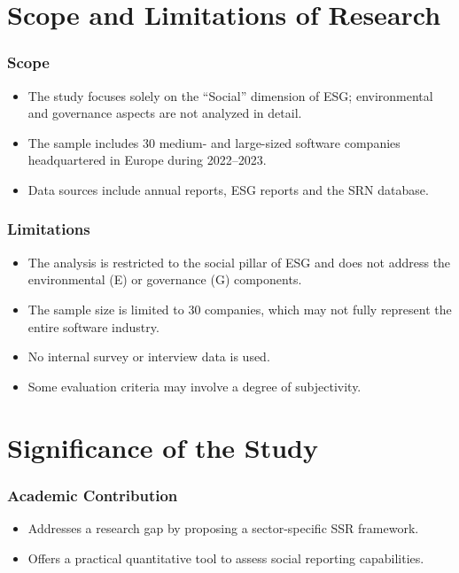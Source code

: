 \section{Scope and Limitations of Research}
\subsubsection{Scope}
\begin{itemize}
    \item The study focuses solely on the “Social” dimension of ESG; environmental and governance aspects are not analyzed in detail.
    \item The sample includes 30 medium- and large-sized software companies headquartered in Europe during 2022--2023.
    \item Data sources include annual reports, ESG reports and the SRN database.
\end{itemize}

\subsubsection{Limitations}
\begin{itemize}
    \item The analysis is restricted to the social pillar of ESG and does not address the environmental (E) or governance (G) components.
    \item The sample size is limited to 30 companies, which may not fully represent the entire software industry.
    \item No internal survey or interview data is used.
    \item Some evaluation criteria may involve a degree of subjectivity.
\end{itemize}

\section{Significance of the Study}
\subsubsection{Academic Contribution}
\begin{itemize}
    \item Addresses a research gap by proposing a sector-specific SSR framework.
    \item Offers a practical quantitative tool to assess social reporting capabilities.
\end{itemize}

